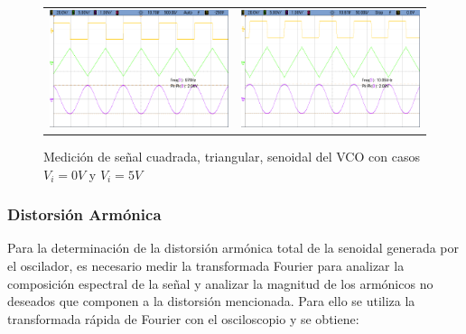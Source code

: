 \begin{figure}[H]
    \centering
    \begin{tabular}{c c}
        \includegraphics[scale=0.2]{../EJ3/Mediciones/Actuales/Osciloscopio/Distorsion_1k/cropped_scope_0.png} & 
        \includegraphics[scale=0.2]{../EJ3/Mediciones/Actuales/Osciloscopio/Distorsion_10k/cropped_scope_13.png} 
    \end{tabular}
    \caption{Medici\'on de se\~nal cuadrada, triangular, senoidal del VCO con casos $V_i = 0V$ y $V_i = 5V$}
    \label{fig:mediciones_funcionamiento}
\end{figure}

\subsubsection{Distorsi\'on Arm\'onica}
Para la determinaci\'on de la distorsi\'on arm\'onica total de la senoidal generada por el oscilador, es necesario medir la transformada Fourier
para analizar la composici\'on espectral de la se\~nal y analizar la magnitud de los arm\'onicos no deseados que componen a la distorsi\'on mencionada.
Para ello se utiliza la transformada r\'apida de Fourier con el osciloscopio y se obtiene:

